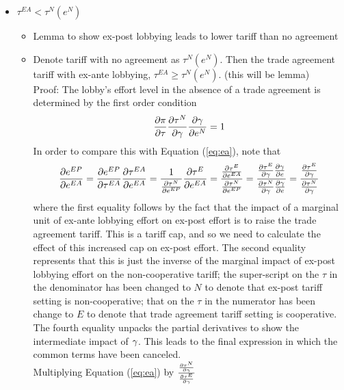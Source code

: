 \newpage
\begin{itemize}					
	\item $\tau^{EA} < \tau^N(e^N)$
		\begin{itemize}
			\item Lemma to show ex-post lobbying leads to lower tariff than no agreement
			\item Denote tariff with no agreement as $\tau^N(e^N)$. Then the trade agreement tariff with ex-ante lobbying, $\tau^{EA} \geq \tau^N(e^N)$. (this will be lemma) \\
			Proof: The lobby's effort level in the absence of a trade agreement is determined by the first order condition
				\begin{equation}
						\frac{\partial \pi}{\partial \tau} \frac{\partial \tau^N}{\partial \gamma} \frac{\partial \gamma}{\partial e^N} = 1
						\label{eq:nta}
				\end{equation}
			In order to compare this with Equation (\ref{eq:ea}), note that
			  \[
				  \frac{\partial e^{EP}}{\partial e^{EA}} = \frac{\partial e^{EP}}{\partial \tau^{EA}} \frac{\partial \tau^{EA}}{\partial e^{EA}} = \frac{1}{\frac{\partial \tau^N}{\partial e^{EP}}} \frac{\partial \tau^{E}}{\partial e^{EA}} =  \frac{\frac{\partial \tau^{E}}{\partial e^{EA}}}{\frac{\partial \tau^N}{\partial e^{EP}}} =  \frac{\frac{\partial \tau^{E}}{\partial \gamma}\frac{\partial \gamma}{\partial e}}{\frac{\partial \tau^N}{\partial \gamma}\frac{\partial \gamma}{\partial e}} =  \frac{\frac{\partial \tau^{E}}{\partial \gamma}}{\frac{\partial \tau^N}{\partial \gamma}} 
				\]
				where the first equality follows by the fact that the impact of a marginal unit of ex-ante lobbying effort on ex-post effort is to raise the trade agreement tariff. This is a tariff cap, and so we need to calculate the effect of this increased cap on ex-post effort. The second equality represents that this is just the inverse of the marginal impact of ex-post lobbying effort on the non-cooperative tariff; the super-script on the $\tau$ in the denominator has been changed to $N$ to denote that ex-post tariff setting is non-cooperative; that on the $\tau$ in the numerator has been change to $E$ to denote that trade agreement tariff setting is cooperative. The fourth equality unpacks the partial derivatives to show the intermediate impact of $\gamma$. This leads to the final expression in which the common terms have been canceled. \\
				Multiplying Equation (\ref{eq:ea}) by $\frac{\frac{\partial \tau^N}{\partial \gamma}}{\frac{\partial \tau^E}{\partial \gamma}}$

\end{itemize}
\end{itemize}
